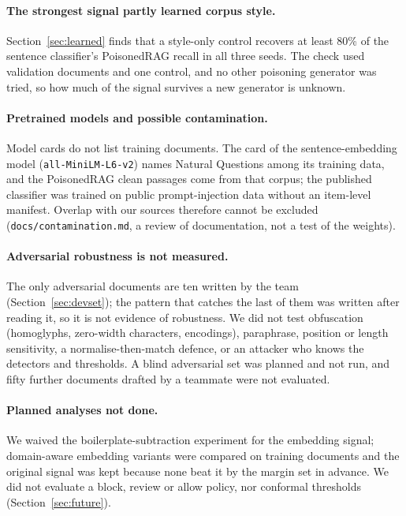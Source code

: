 \paragraph{The strongest signal partly learned corpus style.}
Section~\ref{sec:learned} finds that a style-only control recovers at least 80\%
of the sentence classifier's PoisonedRAG recall in all three seeds. The check used
validation documents and one control, and no other poisoning generator was tried,
so how much of the signal survives a new generator is unknown.

\paragraph{Pretrained models and possible contamination.}
Model cards do not list training documents. The card of the sentence-embedding
model (\texttt{all-MiniLM-L6-v2}) names Natural Questions among its training data,
and the PoisonedRAG clean passages come from that corpus; the published classifier
was trained on public prompt-injection data without an item-level manifest.
Overlap with our sources therefore cannot be excluded
(\texttt{docs/contamination.md}, a review of documentation, not a test of the
weights).

\paragraph{Adversarial robustness is not measured.}
The only adversarial documents are ten written by the team
(Section~\ref{sec:devset}); the pattern that catches the last of them was written
after reading it, so it is not evidence of robustness. We did not test
obfuscation (homoglyphs, zero-width characters, encodings), paraphrase, position
or length sensitivity, a normalise-then-match defence, or an attacker who knows the
detectors and thresholds. A blind adversarial set was planned and not run, and
fifty further documents drafted by a teammate were not evaluated.

\paragraph{Planned analyses not done.}
We waived the boilerplate-subtraction experiment for the embedding signal;
domain-aware embedding variants were compared on training documents and the
original signal was kept because none beat it by the margin set in advance. We
did not evaluate a block, review or allow policy, nor conformal thresholds
(Section~\ref{sec:future}).

